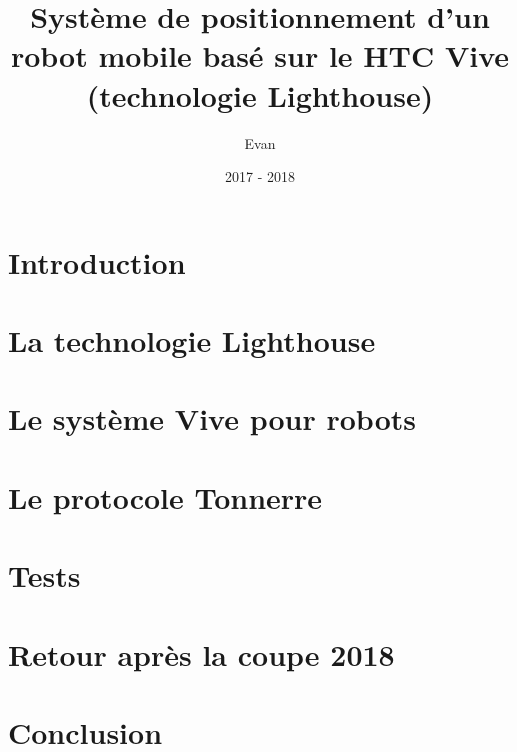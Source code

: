 ﻿\documentclass[10pt,a4paper,french]{report}
\title{Système de positionnement d'un robot mobile basé sur le HTC Vive (technologie Lighthouse)}
\author{Evan \bsc{Roué}}
\date{2017 - 2018}
\begin{document}
\maketitle



\tableofcontents

\thispagestyle{empty}
\setcounter{page}{0}

\chapter{Introduction}


\chapter{La technologie Lighthouse}


\chapter{Le système Vive pour robots}


\chapter{Le protocole Tonnerre}


\chapter{Tests}


\chapter{Retour après la coupe 2018}


\chapter{Conclusion}

\end{document}
